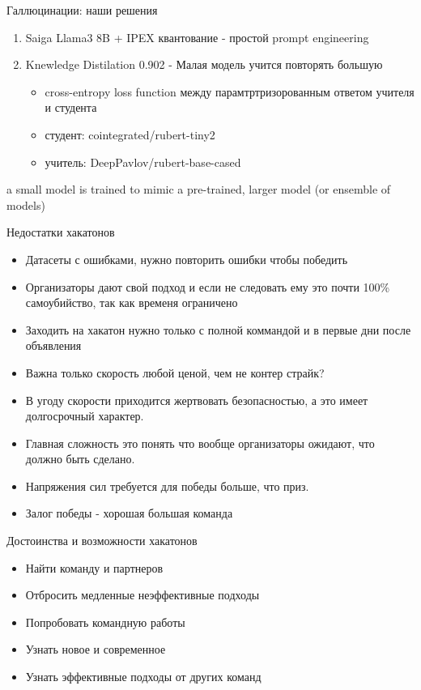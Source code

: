 \documentclass[presentation]{beamer}
\begin{document}
\begin{frame}[label={sec:org1d28d03}]{Галлюцинации: наши решения}
\begin{enumerate}
\item Saiga Llama3 8B + IPEX квантование - простой prompt engineering
\item Knewledge Distilation 0.902 - Малая модель учится повторять большую
\begin{itemize}
\item cross-entropy loss function между парамтртризорованным ответом учителя и студента
\item студент: cointegrated/rubert-tiny2
\item учитель: DeepPavlov/rubert-base-cased
\end{itemize}
\end{enumerate}











a small model is trained to mimic a pre-trained, larger model (or ensemble of models)
\end{frame}

\begin{frame}[label={sec:orga86465e}]{Недостатки хакатонов}
\begin{itemize}
\item Датасеты с ошибками, нужно повторить ошибки чтобы победить
\item Организаторы дают свой подход и если не следовать ему это почти 100\% самоубийство, так как временя ограничено
\item Заходить на хакатон нужно только с полной коммандой и в первые дни после объявления
\item Важна только скорость любой ценой, чем не контер страйк?
\item В угоду скорости приходится жертвовать безопасностью, а это имеет долгосрочный характер.
\item Главная сложность это понять что вообще организаторы ожидают, что должно быть сделано.
\item Напряжения сил требуется для победы больше, что приз.
\item Залог победы - хорошая большая команда
\end{itemize}
\end{frame}

\begin{frame}[label={sec:org620107f}]{Достоинства и возможности хакатонов}
\begin{itemize}
\item Найти команду и партнеров
\item Отбросить медленные неэффективные подходы
\item Попробовать командную работы
\item Узнать новое и современное
\item Узнать эффективные подходы от других команд
\end{itemize}
\end{frame}
\end{document}
